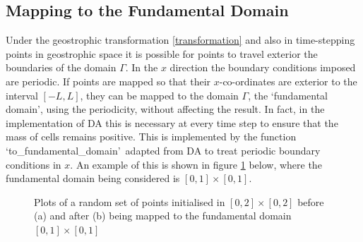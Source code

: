 \subsection{Mapping to the Fundamental Domain}
Under the geostrophic transformation \ref{transformation} and also in time-stepping points in geostrophic space it is possible for points to travel exterior the boundaries of the domain $\Gamma$. In the $x$ direction the boundary conditions imposed are periodic. If points are mapped so that their $x$-co-ordinates are exterior to the interval $[-L,L]$, they can be mapped to the domain $\Gamma$, the \textquoteleft fundamental domain\textquoteright, using the periodicity, without affecting the result.  In fact, in the implementation of DA this is necessary at every time step to ensure that the mass of cells remains positive. This is implemented by the function \textquoteleft to\_fundamental\_domain\textquoteright \ adapted from DA \cite{Merigot2017a} to treat periodic boundary conditions in $x$. An example of this is shown in figure \ref{fundamental domain} below, where the fundamental domain being considered is $[0,1]\times[0,1]$.
\begin{figure}[h!]
	\centering
	\caption{Plots of a random set of points initialised in $[0,2]\times[0,2]$ before (a) and after (b) being mapped to the fundamental domain $[0,1]\times[0,1]$}
	\label{fundamental domain}
\end{figure}
